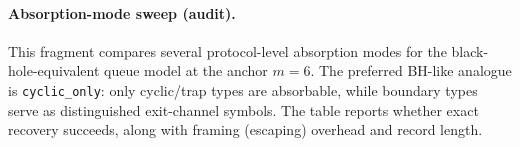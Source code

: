 \paragraph{Absorption-mode sweep (audit).} \AuditTag This fragment compares several protocol-level absorption modes for the black-hole-equivalent queue model at the anchor $m=6$. The preferred BH-like analogue is \texttt{cyclic\_only}: only cyclic/trap types are absorbable, while boundary types serve as distinguished exit-channel symbols. The table reports whether exact recovery succeeds, along with framing (escaping) overhead and record length.